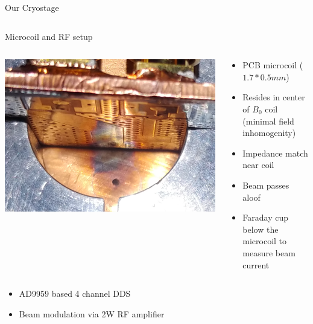 \documentclass[final]{beamer}
\begin{document}
\begin{frame}[fragile]{}
\begin{columns}[T]
\begin{column}{.49\linewidth}
\begin{block}{\Large Our Cryostage}
\begin{columns}
\begin{column}{0.45\columnwidth}
			\end{column}
		\end{columns}
	\end{block}

	\begin{block}{\Large Microcoil and RF setup}
		\begin{columns}
			\begin{column}{0.45\columnwidth}
				\includegraphics[width=\columnwidth]{./figures/microcoil3.png}
			\end{column}
			\begin{column}{0.45\columnwidth}
				\begin{itemize}
					\item PCB microcoil ($1.7 * 0.5 mm$)
					\item Resides in center of $B_0$ coil (minimal field inhomogenity)
					\item Impedance match near coil
					\item Beam passes aloof
					\item Faraday cup below the microcoil to measure beam current
				\end{itemize}
			\end{column}
		\end{columns}
		\vspace{1cm}
		\begin{columns}
			\begin{column}{0.45\columnwidth}
				\begin{itemize}
					\item AD9959 based 4 channel DDS
					\item Beam modulation via 2W RF amplifier

\end{itemize}
\end{column}
\end{columns}
\end{block}
\end{column}
\end{columns}
\end{frame}
\end{document}
